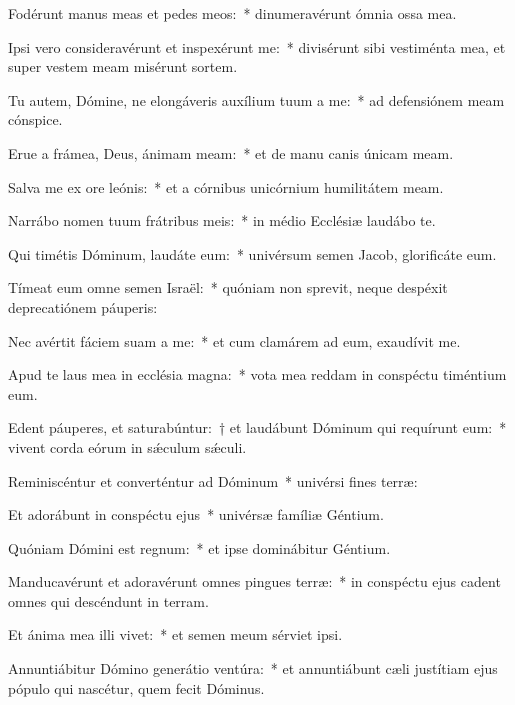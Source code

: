 \item Fodérunt manus meas et pedes meos:~* dinumeravérunt ómnia ossa mea.

\item Ipsi vero consideravérunt et inspexérunt me:~* divisérunt sibi vestiménta mea, et super vestem meam misérunt sortem.

\item Tu autem, Dómine, ne elongáveris auxílium tuum a me:~* ad defensiónem meam cónspice.

\item Erue a frámea, Deus, ánimam meam:~* et de manu canis únicam meam.

\item Salva me ex ore leónis:~* et a córnibus unicórnium humilitátem meam.

\item Narrábo nomen tuum frátribus meis:~* in médio Ecclésiæ laudábo te.

\item Qui timétis Dóminum, laudáte eum:~* univérsum semen Jacob, glorificáte eum.

\item Tímeat eum omne semen Israël:~* quóniam non sprevit, neque despéxit deprecatiónem páuperis:

\item Nec avértit fáciem suam a me:~* et cum clamárem ad eum, exaudívit me.

\item Apud te laus mea in ecclésia magna:~* vota mea reddam in conspéctu timéntium eum.

\item Edent páuperes, et saturabúntur:~† et laudábunt Dóminum qui requírunt eum:~* vivent corda eórum in sǽculum sǽculi.

\item Reminiscéntur et converténtur ad Dóminum~* univérsi fines terræ:

\item Et adorábunt in conspéctu ejus~* univérsæ famíliæ Géntium.

\item Quóniam Dómini est regnum:~* et ipse dominábitur Géntium.

\item Manducavérunt et adoravérunt omnes pingues terræ:~* in conspéctu ejus cadent omnes qui descéndunt in terram.

\item Et ánima mea illi vivet:~* et semen meum sérviet ipsi.

\item Annuntiábitur Dómino generátio ventúra:~* et annuntiábunt cæli justítiam ejus pópulo qui nascétur, quem fecit Dóminus.
